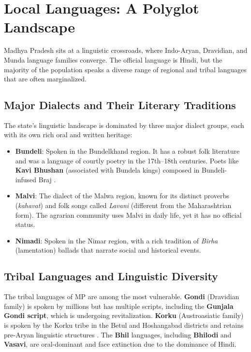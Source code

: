 \documentclass{article}
\begin{document}
\newpage
\section{Local Languages: A Polyglot Landscape}
Madhya Pradesh sits at a linguistic crossroads, where Indo-Aryan, Dravidian, and Munda language families converge. The official language is Hindi, but the majority of the population speaks a diverse range of regional and tribal languages that are often marginalized.

\subsection{Major Dialects and Their Literary Traditions}
The state's linguistic landscape is dominated by three major dialect groups, each with its own rich oral and written heritage:
\begin{itemize}
    \item \textbf{Bundeli}: Spoken in the Bundelkhand region. It has a robust folk literature and was a language of courtly poetry in the 17th–18th centuries. Poets like \textbf{Kavi Bhushan} (associated with Bundela kings) composed in Bundeli-infused Braj \cite{miyamoto2005}.
    \item \textbf{Malvi}: The dialect of the Malwa region, known for its distinct proverbs (\textit{kahavat}) and folk songs called \textit{Lavani} (different from the Maharashtrian form). The agrarian community uses Malvi in daily life, yet it has no official status.
    \item \textbf{Nimadi}: Spoken in the Nimar region, with a rich tradition of \textit{Birha} (lamentation) ballads that narrate social and historical events.
\end{itemize}

\subsection{Tribal Languages and Linguistic Diversity}
The tribal languages of MP are among the most vulnerable. \textbf{Gondi} (Dravidian family) is spoken by millions but has multiple scripts, including the \textbf{Gunjala Gondi script}, which is undergoing revitalization. \textbf{Korku} (Austroasiatic family) is spoken by the Korku tribe in the Betul and Hoshangabad districts and retains pre-Aryan linguistic structures \cite{zaid2018}. The \textbf{Bhil} languages, including \textbf{Bhilodi} and \textbf{Vasavi}, are oral-dominant and face extinction due to the dominance of Hindi.
\end{document}
